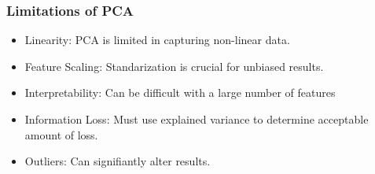 \documentclass[aspectratio=169]{beamer}
\begin{document}
\begin{frame}
\begin{itemize}
    \end{itemize}
    \end{frame}

\begin{frame}
    \frametitle{Limitations of PCA}
    \begin{itemize}
    \item  Linearity: PCA is limited in capturing non-linear data.
    \item Feature Scaling: Standarization is crucial for unbiased results.
    \item Interpretability: Can be difficult with a large number of features
    \item Information Loss: Must use explained variance to determine acceptable amount of loss.
    \item Outliers: Can signifiantly alter results.
    \end{itemize}
    \end{frame}
    
\end{document}
